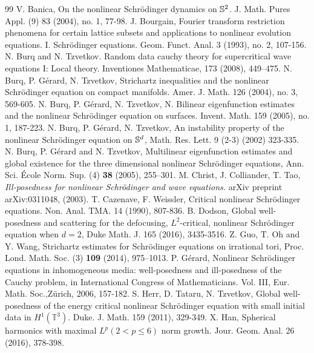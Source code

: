 \documentclass[10pt,a4paper]{amsart}
\numberwithin{equation}{section}
\begin{document}
\begin{thebibliography}{99}
 V. Banica, On the nonlinear Schr\"{o}dinger dynamics on $\Bbb{S}^2$. J. Math. Pures Appl. (9) 83 (2004), no. 1, 77-98.
 J. Bourgain, Fourier transform restriction phenomena for certain lattice subsets and applications to nonlinear evolution equations. I. Schr\"{o}dinger equations. Geom. Funct. Anal. 3 (1993), no. 2, 107-156.
 N. Burq and N. Tzvetkov. Random data cauchy theory for supercritical wave equations I: Local theory. Inventiones Mathematicae, 173 (2008), 449--475.
 N. Burq, P. G\'{e}rard, N. Tzvetkov, Strichartz inequalities and the nonlinear Schr\"{o}dinger equation on compact manifolds. Amer. J. Math. 126 (2004), no. 3, 569-605.
 N. Burq, P. G\'{e}rard, N. Tzvetkov, N. Bilinear eigenfunction estimates and the nonlinear Schr\"{o}dinger equation on surfaces. Invent. Math. 159 (2005), no. 1, 187-223.
 N. Burq, P. G\'{e}rard, N. Tzvetkov, An instability property of the nonlinear Schr\"{o}dinger equation on $\Bbb S^d$, Math. Res. Lett. 9 (2-3) (2002) 323-335.
 N. Burq, P. G\'erard and N. Tzvetkov, Multilinear eigenfunction estimates and global existence for the three dimensional nonlinear Schr\"odinger equations, Ann. Sci. \'Ecole Norm. Sup. (4) {\bf 38} (2005), 255--301.
 M. Christ, J. Colliander, T. Tao, \emph{Ill-posedness for nonlinear Schr\"odinger and wave equations.} arXiv preprint arXiv:0311048, (2003).
 T. Cazenave, F. Weissler, Critical nonlinear Schr\"{o}dinger equations. Non. Anal. TMA. 14 (1990), 807-836.
 B. Dodson, Global well-posedness and scattering for the defocusing, $L^2$-critical, nonlinear Schr\"odinger equation when $d=2$, Duke Math. J. 165 (2016), 3435-3516.
 Z. Guo, T. Oh and Y. Wang, Strichartz estimates for Schr\"odinger equations on irrational tori, Proc. Lond. Math. Soc. (3) {\bf 109} (2014), 975--1013.
 P. G\'{e}rard, Nonlinear Schr\"odinger equations in inhomogeneous media: well-posedness and ill-posedness of the Cauchy problem, in International Congress of Mathematicians. Vol. III, Eur. Math. Soc.,Z\"urich, 2006, 157-182.
 S. Herr, D. Tataru, N. Tzvetkov, Global well-posedness of the energy critical nonlinear Schr\"odinger equation with small initial data in $H^1(\mathbb{T}^3)$. Duke. J. Math. 159 (2011), 329-349.
 X. Han, Spherical harmonics with maximal $L^p(2<p\le 6)$ norm growth. Jour. Geom. Anal. 26 (2016), 378-398.

\end{thebibliography}
\end{document}
